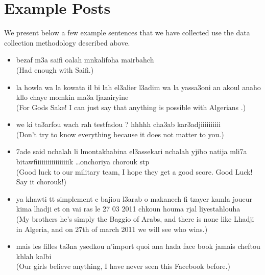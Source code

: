 \documentclass[10pt, a4paper]{article}
\begin{document}
		

\section{Example Posts} We present below a few example sentences that
we have collected use the data collection methodology described above.
\begin{itemize}
  \item bezaf m3a saifi oalah mnkalifoha mairbahch\\(Had enough with
Saifi.)
   \item la howla wa la kowata il bi lah el3alier l3adim wa la
yassa3oni an akoul anaho kllo chaye momkin ma3a ljazairyine\\ (For
Gods Sake! I can just say that anything is possible with Algerians .)
   \item we ki ta3arfou wach rah testfadou ? hhhhh cha3ab
kar3adjiiiiiiiiii\\ (Don't try to know everything because it does not
matter to you.)
   \item 7ade said nchalah li lmontakhabina el3assekari nchalah yjibo
natija mli7a bitawfiiiiiiiiiiiiiiiiik \ldots onchoriya chorouk
stp\\(Good luck to our military team, I hope they get a good
score. Good Luck! Say it chorouk!)
   \item ya khawti tt simplement c bajiou l3arab o makanech fi tzayer
kamla joueur kima lhadji et on vai ras le 27 03 2011 chkoun houma rjal
liyestahlouha\\(My brothers he's simply the Baggio of Arabs, and there
is none like Lhadji in Algeria, and on 27th of march 2011 we will see
who wins.)
   \item mais les filles ta3na ysedkou n'import quoi ana hada face
book jamais cheftou khlah kalbi\\(Our girls believe anything, I have
never seen this Facebook before.)
\end{itemize}
\end{document}
